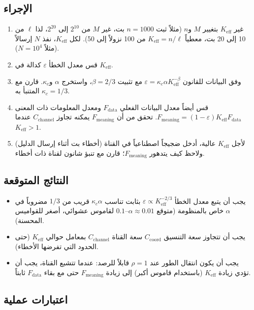 \documentclass[12pt,a4paper]{article}
\newcommand{\Keff}{K_{\mathrm{eff}}}
\theoremstyle{remark}
\begin{document}
	\subsection{الإجراء}
	
	\begin{enumerate}
		\item غير \(\Keff\) بتغيير \(M\) و\(n\) (مثلاً ثبت \(n=1000\) بت، غير \(M\) من \(2^{10}\) إلى \(2^{20}\)، لذا \(\ell\) من 10 إلى 20 بت، معطياً \(\Keff = n/\ell\) من 100 نزولاً إلى 50). لكل \(\Keff\)، نفذ \(N\) إرسالاً (مثلاً \(N=10^4\)).
		\item قس معدل الخطأ \(\varepsilon\) كدالة في \(\Keff\).
		\item وفق البيانات للقانون \(\varepsilon = \kappa_c \alpha K_{\mathrm{eff}}^{-\beta}\) مع تثبيت \(\beta=2/3\)، واستخرج \(\alpha\) و\(\kappa_c\). قارن مع \(\kappa_c=1/3\) المتنبأ به.
		\item قس أيضاً معدل البيانات الفعلي \(F_{\text{data}}\) ومعدل المعلومات ذات المعنى \(F_{\text{meaning}} = (1-\varepsilon) \Keff F_{\text{data}}\). تحقق من أن \(F_{\text{meaning}}\) يمكنه تجاوز \(C_{\text{channel}}\) عندما \(\Keff>1\).
		\item لأجل \(\Keff\) عالية، أدخل ضجيجاً اصطناعياً في القناة (أخطاء بت أثناء إرسال الدليل) ولاحظ كيف يتدهور \(F_{\text{meaning}}\)؛ قارن مع تنبؤ شانون لقناة ذات أخطاء.
	\end{enumerate}
	
	\subsection{النتائج المتوقعة}
	
	\begin{itemize}
		\item يجب أن يتبع معدل الخطأ \(\varepsilon \propto K_{\mathrm{eff}}^{-2/3}\) بثابت تناسب \(\kappa_c \alpha\) قريب من \(1/3\) مضروباً في \(\alpha\) خاص بالمنظومة (متوقع \(\alpha \approx 0.01\)–\(0.1\) لقاموس عشوائي، أصغر للقواميس المحسنة).
		\item يجب أن تتجاوز سعة التنسيق \(C_{\text{coord}}\) سعة القناة \(C_{\text{channel}}\) بمعامل حوالي \(\Keff\) (حتى الحدود التي تفرضها الأخطاء).
		\item يجب أن يكون انتقال الطور عند \(\rho=1\) قابلاً للرصد: عندما تتشبع القناة، يجب أن تؤدي زيادة \(\Keff\) (باستخدام قاموس أكبر) إلى زيادة \(F_{\text{meaning}}\) حتى مع بقاء \(F_{\text{data}}\) ثابتاً.
	\end{itemize}
	
	\subsection{اعتبارات عملية}
	
\end{document}
